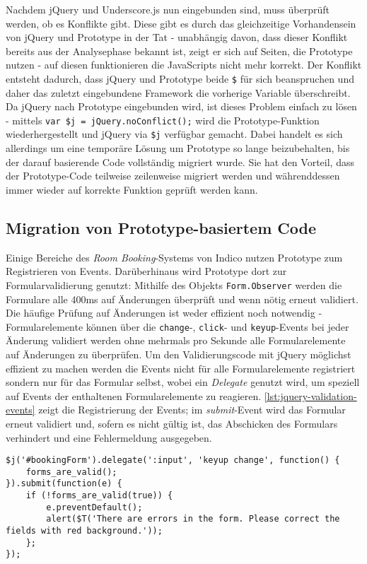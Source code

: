 Nachdem jQuery und Underscore.js nun eingebunden sind, muss überprüft werden, ob es Konflikte gibt.
Diese gibt es durch das gleichzeitige Vorhandensein von jQuery und Prototype in der Tat - unabhängig
davon, dass dieser Konflikt bereits aus der Analysephase bekannt ist, zeigt er sich auf Seiten, die
Prototype nutzen - auf diesen funktionieren die JavaScripts nicht mehr korrekt. Der Konflikt
entsteht dadurch, dass jQuery und Prototype beide \lstinline{$} für sich beanspruchen und daher das
zuletzt eingebundene Framework die vorherige Variable überschreibt. Da jQuery nach Prototype
eingebunden wird, ist dieses Problem einfach zu lösen - mittels
\lstinline{var $j = jQuery.noConflict();} wird die Prototype-Funktion wiederhergestellt und jQuery
via \lstinline{$j} verfügbar gemacht. Dabei handelt es sich allerdings um eine temporäre Lösung um
Prototype so lange beizubehalten, bis der darauf basierende Code vollständig migriert wurde. Sie hat
den Vorteil, dass der Prototype-Code teilweise zeilenweise migriert werden und währenddessen immer
wieder auf korrekte Funktion geprüft werden kann.

\subsection{Migration von Prototype-basiertem Code}

Einige Bereiche des \emph{Room Booking}-Systems von Indico nutzen Prototype zum Registrieren von
Events. Darüberhinaus wird Prototype dort zur Formularvalidierung genutzt: Mithilfe des Objekts
\lstinline{Form.Observer} werden die Formulare alle 400ms auf Änderungen überprüft und wenn nötig
erneut validiert. Die häufige Prüfung auf Änderungen ist weder effizient noch notwendig -
Formularelemente können über die \lstinline{change}-, \lstinline{click}- und
\lstinline{keyup}-Events bei jeder Änderung validiert werden ohne mehrmals pro Sekunde alle
Formularelemente auf Änderungen zu überprüfen. Um den Validierungscode mit jQuery möglichst
effizient zu machen werden die Events nicht für alle Formularelemente registriert sondern nur für
das Formular selbst, wobei ein \emph{Delegate} genutzt wird, um speziell auf Events der enthaltenen
Formularelemente zu reagieren. \autoref{lst:jquery-validation-events} zeigt die Registrierung der
Events; im \emph{submit}-Event wird das Formular erneut validiert und, sofern es nicht gültig ist,
das Abschicken des Formulars verhindert und eine Fehlermeldung ausgegeben.

\begin{lstlisting}[caption=Formularvalidierung via jQuery,label=lst:jquery-validation-events]
$j('#bookingForm').delegate(':input', 'keyup change', function() {
    forms_are_valid();
}).submit(function(e) {
    if (!forms_are_valid(true)) {
        e.preventDefault();
        alert($T('There are errors in the form. Please correct the fields with red background.'));
    };
});
\end{lstlisting}

